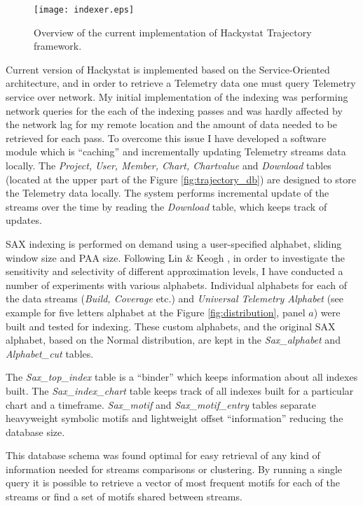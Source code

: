 \begin{figure}[tbp]
   \centering
   \texttt{[image: indexer.eps]}
   \caption{Overview of the current implementation of Hackystat Trajectory framework.}
   \label{fig:indexer}
\end{figure}

Current version of Hackystat is implemented based on the Service-Oriented architecture, and in order to retrieve a Telemetry data one must query Telemetry service over network. My initial implementation of the indexing was performing network queries for the each of the indexing passes and was hardly affected by the network lag for my remote location and the amount of data needed to be retrieved for each pass. To overcome this issue I have developed a software module which is ``caching'' and incrementally updating Telemetry streams data locally. The \textit{Project, User, Member, Chart, Chartvalue} and \textit{Download} tables (located at the upper part of the Figure \ref{fig:trajectory_db}) are designed to store the Telemetry data locally. The system performs incremental update of the streams over the time by reading the \textit{Download} table, which keeps track of updates.

SAX indexing is performed on demand using a user-specified alphabet, sliding window size and PAA size. Following Lin \& Keogh \cite{citeulike:2821475}, in order to investigate the sensitivity and selectivity of different approximation levels, I have conducted a number of experiments with various alphabets. Individual alphabets for each of the data streams (\textit{Build, Coverage} etc.) and \textit{Universal Telemetry Alphabet} (see example for five letters alphabet at the Figure \ref{fig:distribution}, panel $a$) were built and tested for indexing. These custom alphabets, and the original SAX alphabet, based on the Normal distribution, are kept in the \textit{Sax\_alphabet} and \textit{Alphabet\_cut} tables. 

The \textit{Sax\_top\_index} table is a ``binder'' which keeps information about all indexes built. The \textit{Sax\_index\_chart} table keeps track of all indexes built for a particular chart and a timeframe. \textit{Sax\_motif} and \textit{Sax\_motif\_entry} tables separate heavyweight symbolic motifs and lightweight offset ``information'' reducing the database size. 

This database schema was found optimal for easy retrieval of any kind of information needed for streams comparisons or clustering. By running a single query it is possible to retrieve a vector of most frequent motifs for each of the streams or find a set of motifs shared between streams.

